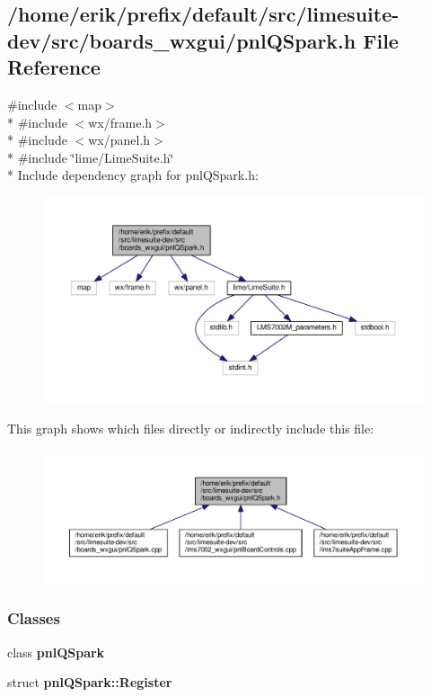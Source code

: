 \subsection{/home/erik/prefix/default/src/limesuite-\/dev/src/boards\+\_\+wxgui/pnl\+Q\+Spark.h File Reference}
\label{pnlQSpark_8h}
{\ttfamily \#include $<$map$>$}\\*
{\ttfamily \#include $<$wx/frame.\+h$>$}\\*
{\ttfamily \#include $<$wx/panel.\+h$>$}\\*
{\ttfamily \#include \char`\"{}lime/\+Lime\+Suite.\+h\char`\"{}}\\*
Include dependency graph for pnl\+Q\+Spark.\+h\+:
\nopagebreak
\begin{figure}[H]
\begin{center}
\leavevmode
\includegraphics[width=350pt]{d9/dd7/pnlQSpark_8h__incl}
\end{center}
\end{figure}
This graph shows which files directly or indirectly include this file\+:
\nopagebreak
\begin{figure}[H]
\begin{center}
\leavevmode
\includegraphics[width=350pt]{de/d34/pnlQSpark_8h__dep__incl}
\end{center}
\end{figure}
\subsubsection*{Classes}
\begin{DoxyCompactItemize}
\item 
class {\bf pnl\+Q\+Spark}
\item 
struct {\bf pnl\+Q\+Spark\+::\+Register}
\end{DoxyCompactItemize}
